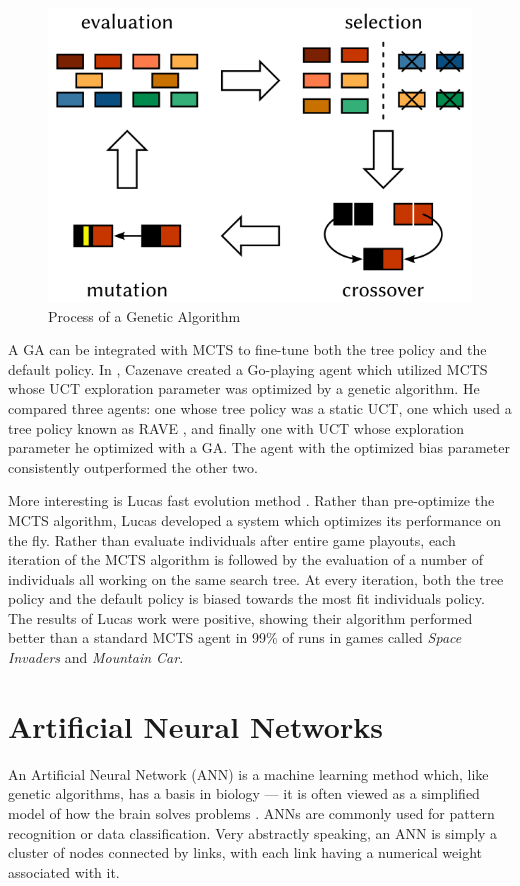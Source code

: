 \begin{figure}[h]
    \centering
    \includegraphics[clip, scale=.3]{images/GA1.png}
    \caption{Process of a Genetic Algorithm}
    \label{fig:GA}
\end{figure}

A GA can be integrated with MCTS to fine-tune both the tree policy and the default policy.  In \cite{Cazenave2007}, Cazenave created a Go-playing agent which utilized MCTS whose UCT exploration parameter was optimized by a genetic algorithm.  He compared three agents: one whose tree policy was a static UCT, one which used a tree policy known as RAVE \cite{rave}, and finally one with UCT whose exploration parameter he optimized with a GA.  The agent with the optimized bias parameter consistently outperformed the other two.

More interesting is Lucas \etals fast evolution method \cite{lucas2014fast}.  Rather than pre-optimize the MCTS algorithm, Lucas \etal developed a system which optimizes its performance on the fly.  Rather than evaluate individuals after entire game playouts, each iteration of the MCTS algorithm is followed by the evaluation of a number of individuals all working on the same search tree.  At every iteration, both the tree policy and the default policy is biased towards the most fit individuals policy.  The results of Lucas \etals work were positive, showing their algorithm performed better than a standard MCTS agent in 99\% of runs in games called \textit{Space Invaders} and \textit{Mountain Car}.

\section{Artificial Neural Networks}
An Artificial Neural Network (ANN) is a machine learning method which, like genetic algorithms, has a basis in biology --- it is often viewed as a simplified model of how the brain solves problems \cite{aimodern}.  ANNs  are commonly used for pattern recognition or data classification.  Very abstractly speaking, an ANN is simply a cluster of nodes connected by links, with each link having a numerical weight associated with it.

